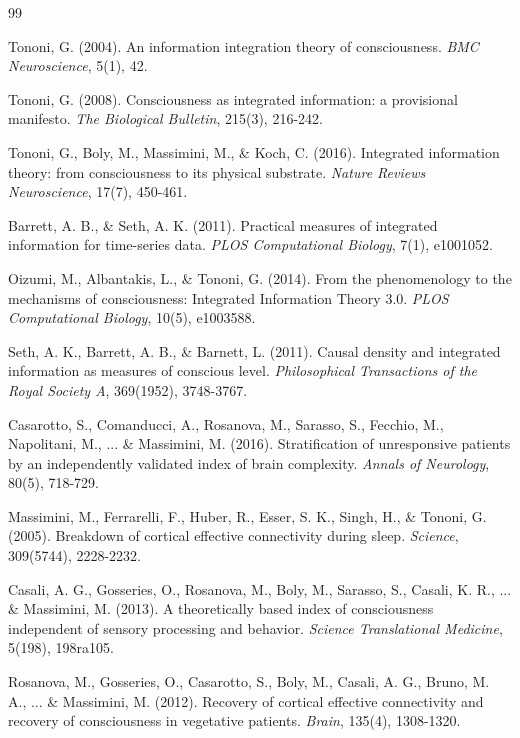 \documentclass[10pt,journal,compsoc]{IEEEtran}
\begin{document}
\begin{thebibliography}{99}

Tononi, G. (2004). An information integration theory of consciousness. \textit{BMC Neuroscience}, 5(1), 42.

Tononi, G. (2008). Consciousness as integrated information: a provisional manifesto. \textit{The Biological Bulletin}, 215(3), 216-242.

Tononi, G., Boly, M., Massimini, M., \& Koch, C. (2016). Integrated information theory: from consciousness to its physical substrate. \textit{Nature Reviews Neuroscience}, 17(7), 450-461.

Barrett, A. B., \& Seth, A. K. (2011). Practical measures of integrated information for time-series data. \textit{PLOS Computational Biology}, 7(1), e1001052.

Oizumi, M., Albantakis, L., \& Tononi, G. (2014). From the phenomenology to the mechanisms of consciousness: Integrated Information Theory 3.0. \textit{PLOS Computational Biology}, 10(5), e1003588.

Seth, A. K., Barrett, A. B., \& Barnett, L. (2011). Causal density and integrated information as measures of conscious level. \textit{Philosophical Transactions of the Royal Society A}, 369(1952), 3748-3767.

Casarotto, S., Comanducci, A., Rosanova, M., Sarasso, S., Fecchio, M., Napolitani, M., ... \& Massimini, M. (2016). Stratification of unresponsive patients by an independently validated index of brain complexity. \textit{Annals of Neurology}, 80(5), 718-729.

Massimini, M., Ferrarelli, F., Huber, R., Esser, S. K., Singh, H., \& Tononi, G. (2005). Breakdown of cortical effective connectivity during sleep. \textit{Science}, 309(5744), 2228-2232.

Casali, A. G., Gosseries, O., Rosanova, M., Boly, M., Sarasso, S., Casali, K. R., ... \& Massimini, M. (2013). A theoretically based index of consciousness independent of sensory processing and behavior. \textit{Science Translational Medicine}, 5(198), 198ra105.

Rosanova, M., Gosseries, O., Casarotto, S., Boly, M., Casali, A. G., Bruno, M. A., ... \& Massimini, M. (2012). Recovery of cortical effective connectivity and recovery of consciousness in vegetative patients. \textit{Brain}, 135(4), 1308-1320.


\end{thebibliography}
\end{document}
